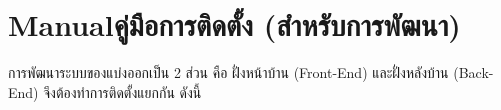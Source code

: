 











\chapter{\ifenglish Manual\else คู่มือการติดตั้ง (สำหรับการพัฒนา)\fi}
การพัฒนาระบบของแบ่งออกเป็น 2 ส่วน คือ ฝั่งหน้าบ้าน (Front-End) และฝั่งหลังบ้าน (Back-End) จึงต้องทำการติดตั้งแยกกัน ดังนี้

